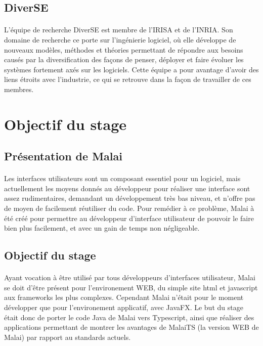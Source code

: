 \documentclass[11pt, a4paper, pdftex]{article}
\begin{document}
    \subsection{DiverSE}\label{subsec:diverse}
             \paragraph{}
                L'équipe de recherche DiverSE est membre de l'IRISA et de l'INRIA. Son domaine de recherche ce porte sur l'ingénierie logiciel, où elle développe de nouveaux modèles,
                méthodes et théories permettant de répondre aux besoins causés par la diversification des façons de penser, déployer et faire évoluer les systèmes fortement axés sur les logiciels.
                Cette équipe a pour avantage d'avoir des liens étroits avec l'industrie, ce qui se retrouve dans la façon de travailler de ces membres.
    \newpage
    \section{Objectif du stage}\label{sec:objsta}
    \vspace{1cm}
        \subsection{Présentation de Malai}\label{subsec:premal}
            \paragraph{}
                Les interfaces utilisateurs sont un composant essentiel pour un logiciel, mais actuellement les moyens donnés au développeur pour réaliser
                une interface sont assez rudimentaires, demandant un développement très bas niveau, et n'offre pas de moyen de facilement réutiliser du code.
                Pour remédier à ce problème, Malai à été créé pour permettre au développeur d'interface utilisateur de pouvoir le faire bien plus facilement, et avec un gain de temps non négligeable.
    \vspace{1cm}
        \subsection{Objectif du stage}\label{subsec:objsta}
            \paragraph{}
                Ayant vocation à être utilisé par tous développeurs d'interfaces utilisateur, Malai se doit d'être présent pour l'environement WEB, du simple site html et javascript aux frameworks les plus complexes.
                Cependant Malai n'était pour le moment développer que pour l'environement applicatif, avec JavaFX. Le but du stage était donc de porter le code Java de Malai
                vers Typescript, ainsi que réaliser des applications permettant de montrer les avantages de MalaiTS (la version WEB de Malai) par rapport au standards actuels.
\end{document}
